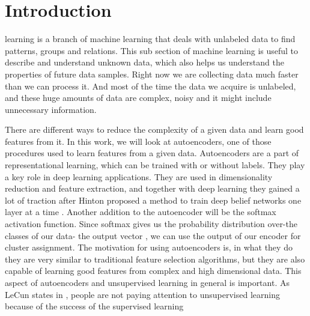 \documentclass[journal]{IEEEtran}
\begin{document}
\section{Introduction}
% 
% 
% 
% 
 learning is a branch of machine learning that deals with unlabeled data to find patterns, groups
and relations. This sub section of machine learning is useful to describe and understand unknown data, which 
also helps us understand the properties of future data samples. Right now we are collecting data much faster than we can process it.
And most of the time the data we acquire is unlabeled, and these huge amounts of data are complex, noisy
and it might include unnecessary information.\par There are different ways to reduce the complexity of a given data and learn good 
features from it. In this work, we will look at autoencoders, one of those procedures used to learn features from a given data.
Autoencoders are a part of representational learning, which can be trained with or without labels.
They play a key role in deep learning applications. They are used in dimensionality reduction and feature 
extraction, and together with deep learning they gained a lot of traction after Hinton proposed a method to train 
deep belief networks one layer at a time \cite{hinton2006fast}. Another addition to the autoencoder will be the softmax activation function.
Since softmax gives us the probability distribution over-the classes of our data- the output vector \cite[pp. 178-181]{goodfellow2016deep}, we can use the output of our
encoder for cluster assignment. The motivation for using autoencoders is, in what they do they are
very similar to traditional feature selection algorithms, but they are also capable of learning good features from
complex and high dimensional data. This aspect of autoencoders and unsupervised learning in general is important. 
As LeCun states in \cite{lecun2015deep}, people are not paying attention to unsupervised learning because of the success of the supervised learning
\end{document}
